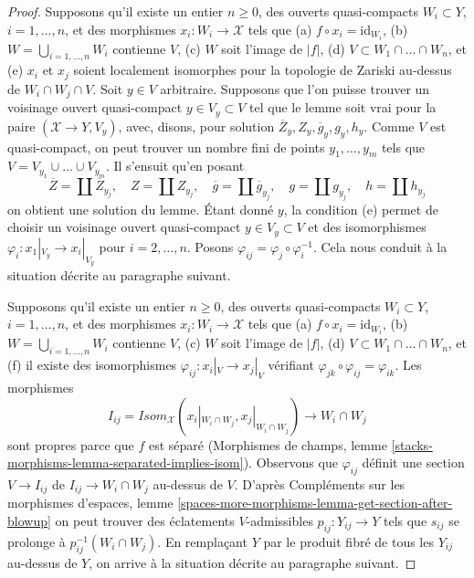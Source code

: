 \begin{proof}
\medskip\noindent
Supposons qu'il existe un entier $n \geq 0$, des ouverts quasi-compacts
$W_i \subset Y$, $i = 1, \ldots, n$, et des
morphismes $x_i : W_i \to \mathcal{X}$ tels que
(a) $f \circ x_i = \text{id}_{W_i}$,
(b) $W = \bigcup_{i = 1, \ldots, n} W_i$ contienne $V$,
(c) $W$ soit l'image de $|f|$,
(d) $V \subset W_1 \cap \ldots \cap W_n$, et
(e) $x_i$ et $x_j$ soient localement isomorphes pour la topologie de Zariski au-dessus de $W_i \cap W_j \cap V$.
Soit $y \in V$ arbitraire.
Supposons que l'on puisse trouver un voisinage ouvert quasi-compact
$y \in V_y \subset V$ tel que le lemme soit vrai pour
la paire $(\mathcal{X} \to Y, V_y)$, avec, disons, pour solution
$\overline{Z}_y, Z_y, \overline{g}_y, g_y, h_y$.
Comme $V$ est quasi-compact, on peut trouver un nombre fini de points
$y_1, \ldots, y_m$ tels que $V = V_{y_1} \cup \ldots \cup V_{y_m}$.
Il s'ensuit qu'en posant
$$
\overline{Z} = \coprod \overline{Z}_{y_j},\quad
Z = \coprod Z_{y_j},\quad
\overline{g} = \coprod \overline{g}_{y_j},\quad
g = \coprod g_{y_j},\quad
h = \coprod h_{y_j}
$$
on obtient une solution du lemme. Étant donné $y$, la condition (e)
permet de choisir un voisinage ouvert quasi-compact $y \in V_y \subset V$
et des isomorphismes $\varphi_i : x_1|_{V_y} \to x_i|_{V_y}$ pour
$i = 2, \ldots, n$. Posons $\varphi_{ij} = \varphi_j \circ \varphi_i^{-1}$.
Cela nous conduit à la situation décrite au paragraphe suivant.

\medskip\noindent
Supposons qu'il existe un entier $n \geq 0$, des ouverts quasi-compacts
$W_i \subset Y$, $i = 1, \ldots, n$, et des
morphismes $x_i : W_i \to \mathcal{X}$ tels que
(a) $f \circ x_i = \text{id}_{W_i}$,
(b) $W = \bigcup_{i = 1, \ldots, n} W_i$ contienne $V$,
(c) $W$ soit l'image de $|f|$,
(d) $V \subset W_1 \cap \ldots \cap W_n$, et
(f) il existe des isomorphismes $\varphi_{ij} : x_i|_V \to x_j|_V$
vérifiant $\varphi_{jk} \circ \varphi_{ij} = \varphi_{ik}$.
Les morphismes
$$
I_{ij} = \mathit{Isom}_\mathcal{X}(x_i|_{W_i \cap W_j},
x_j|_{W_i \cap W_j}) \longrightarrow W_i \cap W_j
$$
sont propres parce que $f$ est séparé
(Morphismes de champs, lemme
\ref{stacks-morphisms-lemma-separated-implies-isom}).
Observons que $\varphi_{ij}$ définit une section $V \to I_{ij}$
de $I_{ij} \to W_i \cap W_j$ au-dessus de $V$.
D'après Compléments sur les morphismes d'espaces, lemme
\ref{spaces-more-morphisms-lemma-get-section-after-blowup}
on peut trouver des éclatements $V$-admissibles
$p_{ij} : Y_{ij} \to Y$ tels que $s_{ij}$
se prolonge à $p_{ij}^{-1}(W_i \cap W_j)$.
En remplaçant $Y$ par le produit fibré de tous les $Y_{ij}$
au-dessus de $Y$, on arrive à la situation décrite au paragraphe suivant.


\end{proof}

